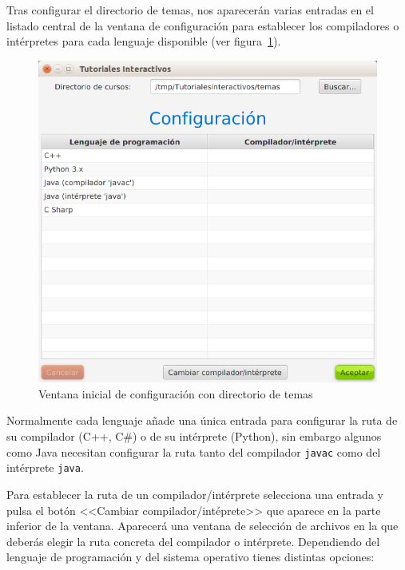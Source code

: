 \documentclass[]{article}
\begin{document}
Tras configurar el directorio de temas, nos aparecerán varias entradas en el listado central de la ventana de configuración para establecer los compiladores o intérpretes para cada lenguaje disponible (ver figura~\ref{fig:config2}).
%
\begin{figure}[tbp]
\begin{center}
\includegraphics[scale=0.4]{Configuracion_lenguajes_vacio.png}
\end{center}
\caption{Ventana inicial de configuración con directorio de temas\label{fig:config2}}
\end{figure}
%
Normalmente cada lenguaje añade una única entrada para configurar la ruta de su compilador (C++, C\#) o de su intérprete (Python), sin embargo algunos como Java necesitan configurar la ruta tanto del compilador \texttt{javac} como del intérprete \texttt{java}.

Para establecer la ruta de un compilador/intérprete selecciona una entrada y pulsa el botón <<Cambiar compilador/intéprete>> que aparece en la parte inferior de la ventana. Aparecerá una ventana de selección de archivos en la que deberás elegir la ruta concreta del compilador o intérprete. Dependiendo del lenguaje de programación y del sistema operativo tienes distintas opciones:
\end{document}
